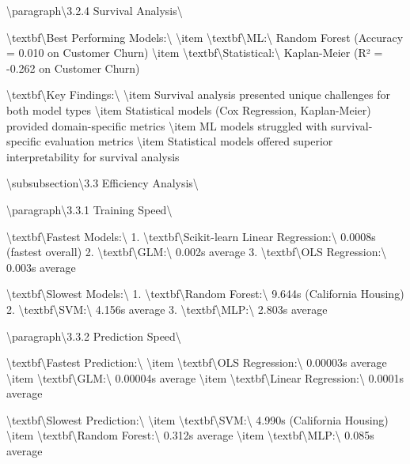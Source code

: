 \documentclass[11pt,a4paper]{article}
\begin{document}
\textbackslash{}paragraph\textbackslash{}{3.2.4 Survival Analysis\textbackslash{}}

\textbackslash{}textbf\textbackslash{}{Best Performing Models:\textbackslash{}}
\textbackslash{}item \textbackslash{}textbf\textbackslash{}{ML:\textbackslash{}} Random Forest (Accuracy = 0.010 on Customer Churn)
\textbackslash{}item \textbackslash{}textbf\textbackslash{}{Statistical:\textbackslash{}} Kaplan-Meier (R² = -0.262 on Customer Churn)

\textbackslash{}textbf\textbackslash{}{Key Findings:\textbackslash{}}
\textbackslash{}item Survival analysis presented unique challenges for both model types
\textbackslash{}item Statistical models (Cox Regression, Kaplan-Meier) provided domain-specific metrics
\textbackslash{}item ML models struggled with survival-specific evaluation metrics
\textbackslash{}item Statistical models offered superior interpretability for survival analysis

\textbackslash{}subsubsection\textbackslash{}{3.3 Efficiency Analysis\textbackslash{}}

\textbackslash{}paragraph\textbackslash{}{3.3.1 Training Speed\textbackslash{}}

\textbackslash{}textbf\textbackslash{}{Fastest Models:\textbackslash{}}
1. \textbackslash{}textbf\textbackslash{}{Scikit-learn Linear Regression:\textbackslash{}} 0.0008s (fastest overall)
2. \textbackslash{}textbf\textbackslash{}{GLM:\textbackslash{}} 0.002s average
3. \textbackslash{}textbf\textbackslash{}{OLS Regression:\textbackslash{}} 0.003s average

\textbackslash{}textbf\textbackslash{}{Slowest Models:\textbackslash{}}
1. \textbackslash{}textbf\textbackslash{}{Random Forest:\textbackslash{}} 9.644s (California Housing)
2. \textbackslash{}textbf\textbackslash{}{SVM:\textbackslash{}} 4.156s average
3. \textbackslash{}textbf\textbackslash{}{MLP:\textbackslash{}} 2.803s average

\textbackslash{}paragraph\textbackslash{}{3.3.2 Prediction Speed\textbackslash{}}

\textbackslash{}textbf\textbackslash{}{Fastest Prediction:\textbackslash{}}
\textbackslash{}item \textbackslash{}textbf\textbackslash{}{OLS Regression:\textbackslash{}} 0.00003s average
\textbackslash{}item \textbackslash{}textbf\textbackslash{}{GLM:\textbackslash{}} 0.00004s average
\textbackslash{}item \textbackslash{}textbf\textbackslash{}{Linear Regression:\textbackslash{}} 0.0001s average

\textbackslash{}textbf\textbackslash{}{Slowest Prediction:\textbackslash{}}
\textbackslash{}item \textbackslash{}textbf\textbackslash{}{SVM:\textbackslash{}} 4.990s (California Housing)
\textbackslash{}item \textbackslash{}textbf\textbackslash{}{Random Forest:\textbackslash{}} 0.312s average
\textbackslash{}item \textbackslash{}textbf\textbackslash{}{MLP:\textbackslash{}} 0.085s average
\end{document}
